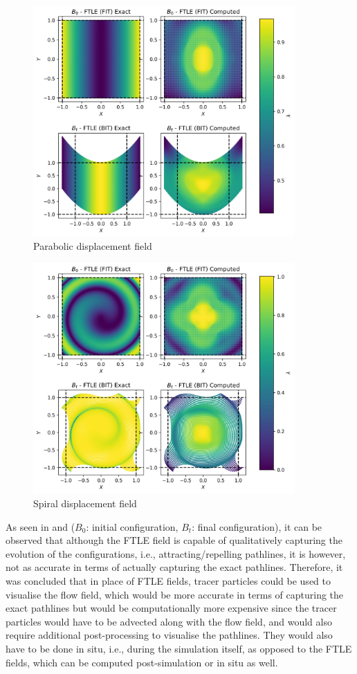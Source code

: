 \begin{figure}[H]
		\centering\includegraphics[width=10cm]{Code-Figures/ftle_parabolic.png}
		\caption{Parabolic displacement field}
    \label{fig:ftle-parabolic}
\end{figure}
\begin{figure}[H]
  \centering\includegraphics[width=10cm]{Code-Figures/ftle_spiral.png}
  \caption{Spiral displacement field}
  \label{fig:ftle-spiral}
\end{figure}

As seen in  and  ($B_0$: initial configuration, $B_t$: final configuration), it can be observed that although the FTLE field is capable of qualitatively capturing the evolution of the configurations, i.e., attracting/repelling pathlines, it is however, not as accurate in terms of actually capturing the exact pathlines. Therefore, it was concluded that in place of FTLE fields, tracer particles could be used to visualise the flow field, which would be more accurate in terms of capturing the exact pathlines but would be computationally more expensive since the tracer particles would have to be advected along with the flow field, and would also require additional post-processing to visualise the pathlines. They would also have to be done in situ, i.e., during the simulation itself, as opposed to the FTLE fields, which can be computed post-simulation or in situ as well.


